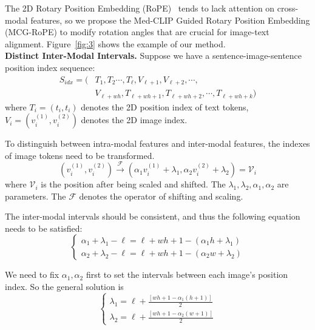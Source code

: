 The 2D Rotary Position Embedding (RoPE)~\cite{su2023roformerenhancedtransformerrotary} tends to lack attention on cross-modal features, so we propose the Med-CLIP Guided Rotary Position Embedding (MCG-RoPE) to modify rotation angles that are crucial for image-text alignment.
Figure~\ref{fig:3} shows the example of our method.\\
\textbf{Distinct Inter-Modal Intervals.}
Suppose we have a sentence-image-sentence position index sequence:
\begin{equation}
\begin{aligned}
S_{idx} = (&T_1, T_2\cdots, T_\ell, V_{\ell+1}, V_{\ell+2}, \cdots, \\ 
&V_{\ell+wh}, T_{\ell+wh+1},T_{\ell + wh +2}, \cdots, T_{\ell+wh+k})
\end{aligned}
\end{equation}
where $T_i = (t_i, t_i)$ denotes the 2D position index of text tokens, $V_i = (v^{(1)}_{i}, v^{(2)}_{i})$ denotes the 2D image index.


To distinguish between intra-modal features and inter-modal features, the indexes of image tokens need to be transformed.
\begin{equation}
\left( v_i^{(1)}, v_i^{(2)} \right) \xrightarrow{\mathcal F} \left( \alpha_1 v_i^{(1)} + \lambda_1, \alpha_2 v_i^{(2)} + \lambda_2 \right) = \mathcal V_i
\end{equation}
where $\mathcal{V}_{i}$ is the position after being scaled and shifted. The $\lambda_1,\lambda_2, \alpha_1, \alpha_2$ are parameters. The $\mathcal{F}$ denotes the operator of shifting and scaling.

The inter-modal intervals should be consistent, and thus the following equation needs to be satisfied:
\begin{equation}
\begin{cases}
    \alpha_{1} + \lambda_{1}-\ell=\ell + wh+1 - (\alpha_{1}h + \lambda_{1}) \\
    \alpha_{2} + \lambda_{2}-\ell=\ell + wh+1 - (\alpha_{2}w + \lambda_{2})
\end{cases}
\end{equation}

We need to fix $\alpha_1,\alpha_2$ first to set the intervals between each image's position index. So the general solution is 
\begin{equation}
    \begin{cases}
\lambda_{1}=\ell + \frac{[wh + 1-\alpha_{1}(h+1)]}{2} \\
\lambda_{2}=\ell + \frac{[wh + 1-\alpha_{2}(w+1)]}{2}
\end{cases}
\end{equation}

